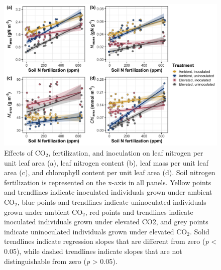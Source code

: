 \newpage
\begin{landscape}
    \begin{figure}
        \centering
        \includegraphics[scale = 0.0625]{ch5_NxCO2xI/figs/NxCO2xI_fig1_leafN.png}
        \caption[Effects of CO$_2$, fertilization, and inoculation on leaf nitrogen per unit leaf area, leaf nitrogen content, leaf mass per unit leaf area, and chlorophyll content per unit leaf area.]{Effects of CO$_2$, fertilization, and inoculation on leaf nitrogen per unit leaf area (a), leaf nitrogen content (b), leaf mass per unit leaf area (c), and chlorophyll content per unit leaf area (d). Soil nitrogen fertilization is represented on the x-axis in all panels. Yellow points and trendlines indicate inoculated individuals grown under ambient CO$_2$, blue points and trendlines indicate uninoculated individuals grown under ambient CO$_2$, red points and trendlines indicate inoculated individuals grown under elevated CO2, and grey points indicate uninoculated individuals grown under elevated CO$_2$. Solid trendlines indicate regression slopes that are different from zero (\textit{p} < 0.05), while dashed trendlines indicate slopes that are not distinguishable from zero (\textit{p} > 0.05).}
        \label{fig:figure5.1}
    \end{figure}
\end{landscape}
\clearpage

